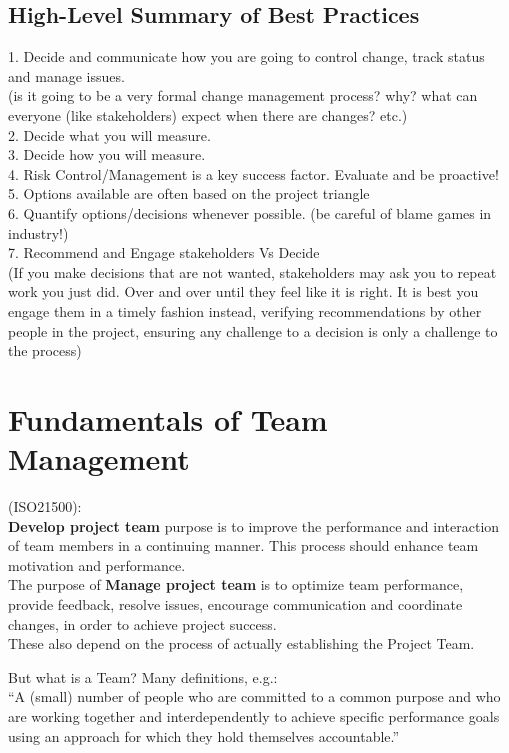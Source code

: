 \documentclass[]{project_plan}
\begin{document}
\section{High-Level Summary of Best Practices}
1. Decide and communicate how you are going to control change, track status and manage issues.\\
(is it going to be a very formal change management process? why? what can everyone (like stakeholders) expect when there are changes? etc.)\\
2. Decide what you will measure.\\
3. Decide how you will measure.\\
4. Risk Control/Management is a key success factor. Evaluate and be proactive!\\
5. Options available are often based on the project triangle\\
6. Quantify options/decisions whenever possible. (be careful of blame games in industry!)\\
7. Recommend and Engage stakeholders Vs Decide\\
(If you make decisions that are not wanted, stakeholders may ask you to repeat work you just did. Over and over until they feel like it is right. It is best you engage them in a timely fashion instead, verifying recommendations by other people in the project, ensuring any challenge to a decision is only a challenge to the process)

\chapter{Fundamentals of Team Management}

 (ISO21500):\\
\textbf{Develop project team} purpose is to improve the performance and interaction
of team members in a continuing manner. This process should enhance team motivation
and performance.\\
The purpose of \textbf{Manage project team} is to optimize team performance,
provide feedback, resolve issues, encourage communication and coordinate changes, in
order to achieve project success.\\
These also depend on the process of actually establishing the Project Team.

But what is a Team? Many definitions, e.g.:\\
“A (small) number of people who are committed to a common purpose and who are
working together and interdependently to achieve specific performance goals using an
approach for which they hold themselves accountable.”
\end{document}
